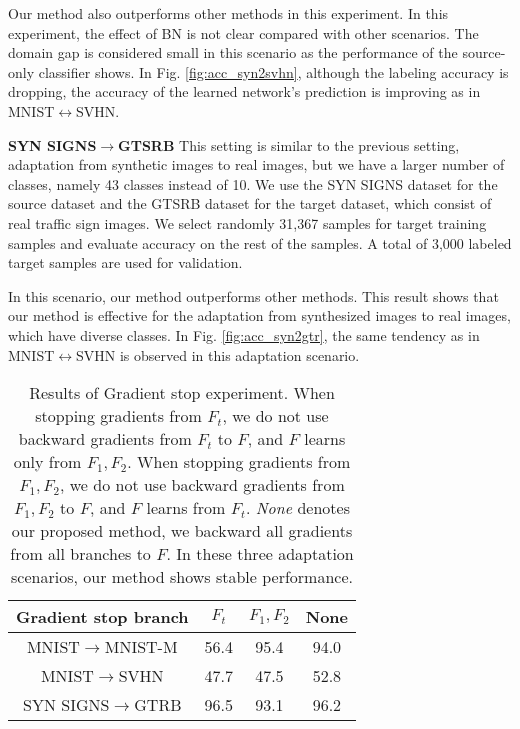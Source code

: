 \documentclass{article}
\begin{document}
Our method also outperforms other methods in this experiment.  In this experiment, the effect of BN is not clear compared with other scenarios. The domain gap is considered small in this scenario as the performance of the source-only classifier shows. In Fig. \ref{fig:acc_syn2svhn}, although the labeling accuracy is dropping, the accuracy of the learned network's prediction is improving as in MNIST$\leftrightarrow$SVHN.

\textbf{SYN SIGNS$\rightarrow$GTSRB}
This setting is similar to the previous setting, adaptation from synthetic images to real images, but we have a larger number of classes, namely 43 classes instead of 10. We use the SYN SIGNS dataset \cite{ganin2014unsupervised} for the source dataset and the GTSRB dataset \cite{stallkamp2011german} for the target dataset, which consist of real traffic sign images. We select randomly 31,367 samples for target training samples and evaluate accuracy on the rest of the samples. A total of 3,000 labeled target samples are used for validation.

In this scenario, our method outperforms other methods. This result shows that our method is effective for the adaptation from synthesized images to real images, which have diverse classes. In Fig. \ref{fig:acc_syn2gtr}, the same tendency as in MNIST$\leftrightarrow$SVHN is observed in this adaptation scenario.
\begin{table}
\begin{center}
\begin{tabular}{c|ccc}
\hline
\abovespace\belowspace
{Gradient stop branch}&{\scriptsize $F_t$}&{\scriptsize $F_1,F_2$}&{\scriptsize	None}\\\hline
MNIST$\rightarrow$MNIST-M&56.4&95.4&94.0\\\hline
 MNIST$\rightarrow$SVHN&47.7&47.5&52.8\\\hline
 SYN SIGNS$\rightarrow$GTRB&96.5&93.1&96.2\\\hline
\end{tabular}
\caption{Results of Gradient stop experiment. When stopping gradients from $F_t$, we do not use backward gradients from $F_t$ to $F$, and $F$ learns only from $F_1,F_2$. When stopping gradients from $F_1,F_2$, we do not use backward gradients from $F_1,F_2$ to $F$, and $F$ learns from $F_t$. \textit{None} denotes our proposed method, we backward all gradients from all branches to $F$. In these three adaptation scenarios, our method shows stable performance.}
\label{table:stop_grad}
\end{center}
\end{table}
\end{document}
